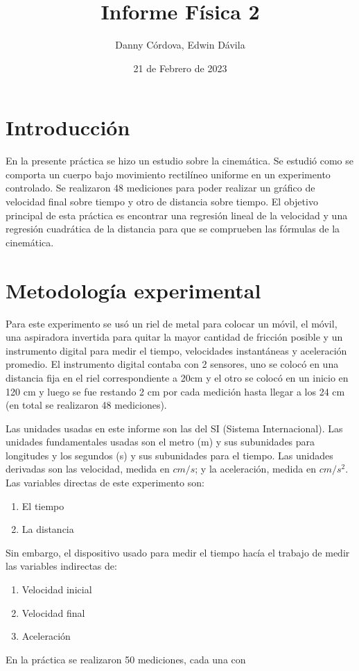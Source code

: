 \documentclass[a4paper]{article}
\title{Informe Física 2}
\author{Danny Córdova, Edwin Dávila}
\date{21 de Febrero de 2023}
\begin{document}
\maketitle

\section{Introducción}
En la presente práctica se hizo un estudio sobre la cinemática. Se estudió como se comporta un cuerpo bajo movimiento rectilíneo uniforme en un experimento controlado. Se realizaron 48 mediciones para poder realizar un gráfico de velocidad final sobre tiempo y otro de distancia sobre tiempo. El objetivo principal de esta práctica es encontrar una regresión lineal de la velocidad y una regresión cuadrática de la distancia para que se comprueben las fórmulas de la cinemática. 

\section{Metodología experimental}
Para este experimento se usó un riel de metal para colocar un móvil, el móvil, una aspiradora invertida para quitar la mayor cantidad de fricción posible y un instrumento digital para medir el tiempo, velocidades instantáneas y aceleración promedio. El instrumento digital contaba con 2 sensores, uno se colocó en una distancia fija en el riel correspondiente a 20cm y el otro se colocó en un inicio en 120 cm y luego se fue restando 2 cm por cada medición hasta llegar a los 24 cm (en total se realizaron 48 mediciones). 

Las unidades usadas en este informe son las del SI (Sistema Internacional). Las unidades fundamentales usadas son el metro (m) y sus subunidades para longitudes y los segundos (s) y sus subunidades para el tiempo. Las unidades derivadas son las velocidad, medida en $cm/s$; y la aceleración, medida en $cm/s^2$.
Las variables directas de este experimento son: 
\begin{enumerate}
    \item El tiempo
    \item La distancia
\end{enumerate}   
Sin embargo, el dispositivo usado para medir el tiempo hacía el trabajo de medir las variables indirectas de: 
\begin{enumerate}
    \item Velocidad inicial
    \item Velocidad final
    \item Aceleración
\end{enumerate}
En la práctica se realizaron 50 mediciones, cada una con 
\end{document}
